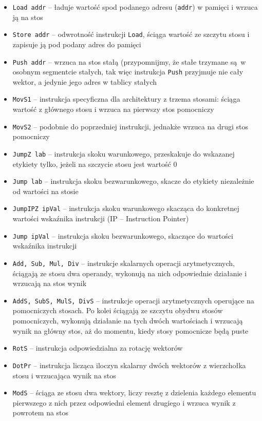 \begin{itemize}
  \item \texttt{Load addr} -- ładuje wartość spod podanego adresu (\texttt{addr}) w pamięci i wrzuca ją na stos
  \item \texttt{Store addr} -- odwrotność instrukcji \texttt{Load}, ściąga wartość ze szczytu stosu i zapisuje ją pod podany adres do pamięci
  \item \texttt{Push addr} -- wrzuca na stos stałą (przypomnijmy, że stałe trzymane są w osobnym segmentcie stałych, tak więc instrukcja \texttt{Push} przyjmuje nie cały wektor, a jedynie jego adres w tablicy stałych
  \item \texttt{MovS1} -- instrukcja specyficzna dla architektury z trzema stosami: ściąga wartość z głównego stosu i wrzuca na pierwszy stos pomocniczy
  \item \texttt{MovS2} -- podobnie do poprzedniej instrukcji, jednakże wrzuca na drugi stos pomocniczy
  \item \texttt{JumpZ lab} -- instrukcja skoku warunkowego, przeskakuje do wskazanej etykiety tylko, jeżeli na szczycie stosu jest wartość 0
  \item \texttt{Jump lab} -- instrukcja skoku bezwarunkowego, skacze do etykiety niezależnie od wartości na stosie
  \item \texttt{JumpIPZ ipVal} -- instrukcja skoku warunkowego skacząca do konkretnej wartości wskaźnika instrukcji (IP -- Instruction Pointer)
  \item \texttt{Jump ipVal} -- instrukcja skoku bezwarunkowego, skaczące do wartości wskaźnika instrukcji
  \item \texttt{Add, Sub, Mul, Div} -- instrukcje skalarnych operacji arytmetycznych, ściągają ze stosu dwa operandy, wykonują na nich odpowiednie działanie i wrzucają na stos wynik
  \item \texttt{AddS, SubS, MulS, DivS} -- instrukcje operacji arytmetycznych operujące na pomocniczych stosach. Po kolei ściągają ze szczytu obydwu stosów pomocniczych, wykonują działanie na tych dwóch wartościach i wrzucają wynik na główny stos, aż do momentu, kiedy stosy pomocnicze będą puste
  \item \texttt{RotS} -- instrukcja odpowiedzialna za rotację wektorów
  \item \texttt{DotPr} -- instrukcja licząca iloczyn skalarny dwóch wektorów z wierzchołka stosu i wrzucająca wynik na stos
  \item \texttt{ModS} -- ściąga ze stosu dwa wektory, liczy resztę z dzielenia każdego elementu pierwszego z nich przez odpowiedni element drugiego i wrzuca wynik z powrotem na stos
\end{itemize}

